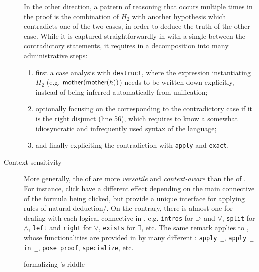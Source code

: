 \begin{description}
  In the other direction, a pattern of reasoning that occurs multiple times in
  the proof is the combination of $H_2$ with another hypothesis which
  contradicts one of the two cases, in order to deduce the truth of the other
  case. While it is captured straightforwardly in  with a single 
  between the contradictory statements, it requires in  a decomposition into
  many administrative steps:
  \begin{enumerate}
    \item first a case analysis with \texttt{destruct}, where the expression
    instantiating $H_2$ (e.g. $\mbox{\textsf{mother}}(\mbox{\textsf{mother}}(h))$) needs to be written down
    explicitly, instead of being inferred automatically from unification;
    \item optionally focusing on the  corresponding to the contradictory
    case if it is the right disjunct (line 56), which requires to know a
    somewhat idiosyncratic and infrequently used syntax of the  language;
    \item and finally expliciting the contradiction with \texttt{apply} and
    \texttt{exact}.
  \end{enumerate}

  \item[Context-sensitivity] More generally, the  of  are more
  \emph{versatile} and \emph{context-aware} than the  of .
  For instance, click  have a different effect depending on the main
  connective of the formula being clicked, but provide a unique interface for
  applying rules of natural deduction/. On the contrary,
  there is almost one  for dealing with each logical connective in
  , e.g. \texttt{intros} for $\supset$ and $\forall$, \texttt{split} for
  $\land$, \texttt{left} and \texttt{right} for $\lor$, \texttt{exists} for
  $\exists$, etc. The same remark applies to  , whose
  functionalities are provided in  by many different :
  \texttt{apply \_}, \texttt{apply \_ in \_}, \texttt{pose proof},
  \texttt{specialize}, etc.
\end{description}

\begin{figure}
  
  \caption{  formalizing 's riddle}
\end{figure}

